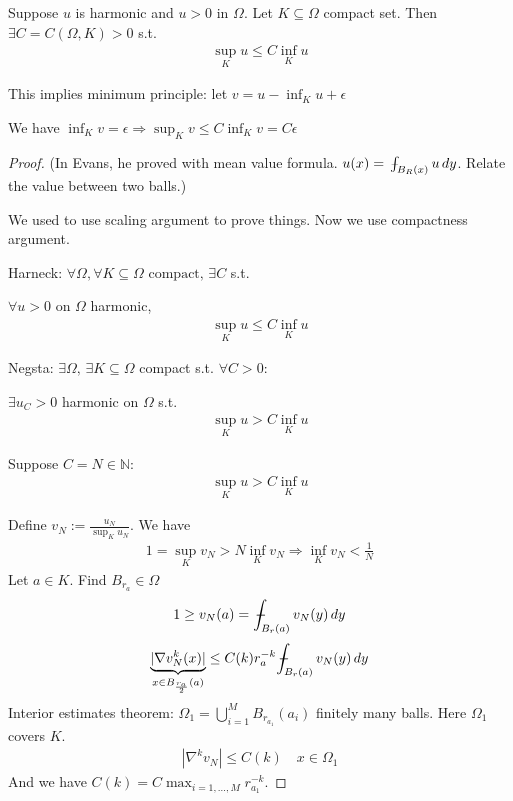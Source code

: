 \documentclass[11pt]{article}
\begin{document}
\begin{proposition}
    Suppose $u$ is harmonic and $u >0$ in $\Omega$. 
    Let $K \subseteq \Omega$ compact set. Then $\exists  C = C(\Omega,K) > 0$ s.t.
    \begin{align*}
        \sup_{K} u \le C\inf_{K}u
    \end{align*}
\end{proposition}
\begin{remark}
    This implies minimum principle: let $v = u-\inf_{K}u + \epsilon$

    We have $\inf_{K}v = \epsilon \Longrightarrow \sup_{K}v \le C\inf_{K}v = C\epsilon$
\end{remark}
\begin{proof}
    (In Evans, he proved with mean value formula. $u(x) = \barint_{B_{R}(x)}u\,dy$. 
    Relate the value between two balls.)

    We used to use scaling argument to prove things. Now we use compactness argument.

    Harneck: $\forall \Omega, \forall K \subseteq \Omega \text{ compact, }\exists C$ s.t.

    $\forall u > 0$ on $\Omega$ harmonic,
    \begin{align*}
        \sup_{K}u \le C\inf_{K}u
    \end{align*}

    Negsta: $\exists \Omega, \, \exists K \subseteq \Omega$ compact s.t. $\forall C > 0$:

    $\exists u_{C} > 0$ harmonic on $\Omega$ s.t.
    \begin{align*}
        \sup_{K}u > C\inf_{K}u
    \end{align*}

    Suppose $C = N \in \mathbb{N}$:
    \begin{align*}
        \sup_{K}u > C\inf_{K}u
    \end{align*}

    Define $v_{N} := \frac{u_{N}}{\sup_{K}u_{N}}$. We have
    \begin{align*}
        1 = \sup_{K}v_{N} > N\inf_{K}v_{N} \Longrightarrow \inf_{K}v_{N} < \frac{1}{N} 
    \end{align*}
    Let $a \in K$. Find $B_{r_{a}} \in \Omega$
    \begin{align*}
        1 \ge v_{N}(a) = \barint_{B_{r}(a)}v_{N}(y)\,dy
    \end{align*}
    \begin{align*}
        \underbrace{|\nabla v_{N}^{k}(x)|}_{x \in B_{\frac{r_a}{2}}(a)} 
            \le C(k)r_{a}^{-k}\barint_{B_{r}(a)}v_{N}(y)\,dy
    \end{align*}
    Interior estimates theorem: $\Omega_{1} = \bigcup_{i=1}^{M}B_{r_{a_1}}(a_i)$ finitely many balls.
    Here $\Omega_1$ covers $K$.
    \begin{align*}
        |\nabla^{k}v_{N}| \le C(k) \quad x \in \Omega_1
    \end{align*}
    And we have $C(k) = C \max_{i=1, \ldots ,M}r_{a_1}^{-k}$.


\end{proof}
\end{document}

